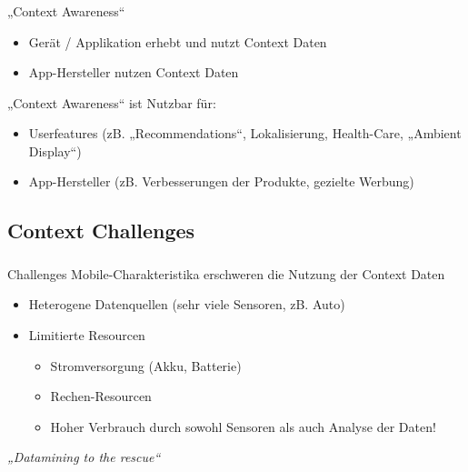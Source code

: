 \begin{frame}
    \frametitle{\insertsubsection} 
    „Context Awareness“ \cite{context2015} \cite{orsini2016}
    \begin{itemize}
        \setlength\itemsep{0.7em}
        \item Gerät / Applikation erhebt und nutzt Context Daten
        \item App-Hersteller nutzen Context Daten
    \end{itemize}
    \vspace{2em}

    \begin{block}{„Context Awareness“ ist Nutzbar für:}
        \begin{itemize}%
            \setlength\itemsep{0.7em}
            \item Userfeatures (zB. „Recommendations“, Lokalisierung, Health-Care, „Ambient Display“)
            \item App-Hersteller (zB. Verbesserungen der Produkte, gezielte Werbung)
        \end{itemize}
    \end{block}
\end{frame}

\subsection{Context Challenges}

\begin{frame}
    \frametitle{\insertsubsection} 
    \begin{block}{Challenges \cite{context2015} \cite{orsini2016}}
        \vspace{0.5em}
        Mobile-Charakteristika erschweren die Nutzung der Context Daten 
        \vspace{1em}
        \begin{itemize}%
            \setlength\itemsep{1em}
            \item Heterogene Datenquellen (sehr viele Sensoren, zB. Auto)
            \item Limitierte Resourcen
            \begin{itemize}%
                \setlength\itemsep{0.4em}
                \item Stromversorgung (Akku, Batterie) 
                \item Rechen-Resourcen
                \item Hoher Verbrauch durch sowohl Sensoren als auch Analyse der Daten!
            \end{itemize}
        \end{itemize}
    \end{block}
    \vspace{1em}
    \emph{„Datamining to the rescue“}
\end{frame}